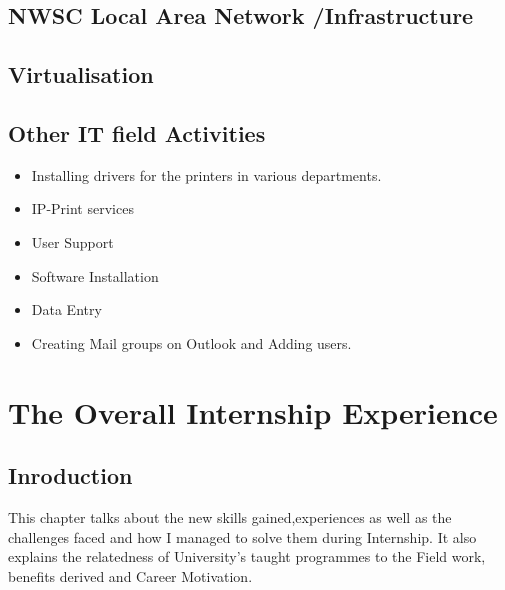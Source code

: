 \documentclass{article}
\begin{document}
\subsection{NWSC Local Area Network /Infrastructure}
\subsection{Virtualisation}












\subsection{Other IT field Activities}
\begin{itemize}
\item Installing drivers for the printers in various departments.
\item IP-Print services
\item User Support
\item Software Installation
\item Data Entry
\item Creating Mail groups on Outlook and Adding users.
\end{itemize}
\newpage
\section{The Overall Internship Experience}
\subsection{Inroduction}
This chapter talks about the  new skills gained,experiences as well as the challenges faced and how I managed to solve them during Internship. It also explains the relatedness of University’s taught programmes to the Field work, benefits derived and Career Motivation.
\end{document}

